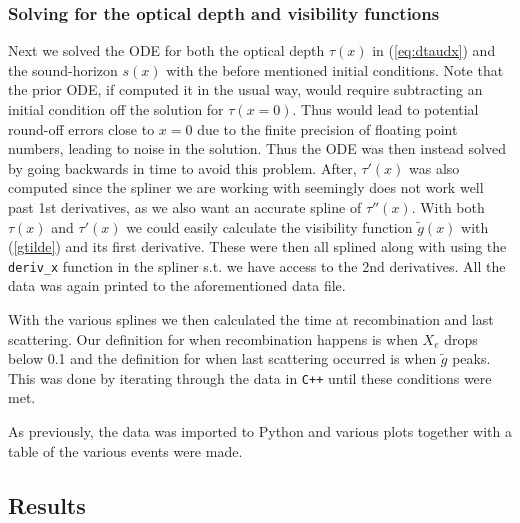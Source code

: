 \documentclass[%
reprint,
 amsmath,amssymb,
 aps,
]{revtex4-2}
\begin{document}
\subsubsection{Solving for the optical depth and visibility functions}
Next we solved the ODE for both the optical depth $\tau(x)$ in (\ref{eq:dtaudx}) and the sound-horizon $s(x)$ with the before mentioned initial conditions. Note that the prior ODE, if computed it in the usual way, would require subtracting an initial condition off the solution for $\tau(x=0)$. Thus would lead to potential round-off errors close to $x=0$ due to the finite precision of floating point numbers, leading to noise in the solution. Thus the ODE was then instead solved by going backwards in time to avoid this problem. After, $\tau'(x)$ was also computed since the spliner we are working with seemingly does not work well past 1st derivatives, as we also want an accurate spline of $\tau''(x)$. With both $\tau(x)$ and $\tau'(x)$ we could easily calculate the visibility function $\tilde g(x)$ with (\ref{gtilde}) and its first derivative. These were then all splined along with using the \texttt{deriv\_x} function in the spliner s.t. we have access to the 2nd derivatives. All the data was again printed to the aforementioned data file.

With the various splines we then calculated the time at recombination and last scattering. Our definition for when recombination happens is when $X_e$ drops below 0.1 and the definition for when last scattering occurred is when $\tilde g$ peaks. This was done by iterating through the data in \texttt{C++} until these conditions were met.

As previously, the data was imported to Python and various plots together with a table of the various events were made.

\subsection{Results}
\end{document}
